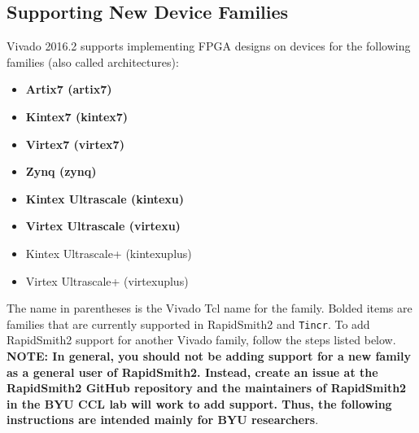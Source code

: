 \subsection{Supporting New Device Families} \label{sec:newFamilies}
Vivado 2016.2 supports implementing FPGA designs on devices for the following
families (also called architectures):

\begin{multicols}{2}
	\begin {itemize}
	  \item \textbf{Artix7 (artix7)}
	  \item \textbf{Kintex7 (kintex7)}
	  \item \textbf{Virtex7 (virtex7)}
	  \item \textbf{Zynq (zynq)}
	  \item \textbf{Kintex Ultrascale (kintexu)}
	  \item \textbf{Virtex Ultrascale (virtexu)}
	  \item Kintex Ultrascale+ (kintexuplus)
	  \item Virtex Ultrascale+ (virtexuplus)
	\end{itemize}
\end{multicols}

\noindent The name in parentheses is the Vivado Tcl name for the family. Bolded
items are families that are currently supported in RapidSmith2 and
\texttt{Tincr}. To add RapidSmith2 support for another Vivado family, follow the
steps listed below. \textbf{NOTE: In general, you should not be adding support
for a new family as a general user of RapidSmith2. Instead, create an issue at the
RapidSmith2 GitHub repository and the maintainers of RapidSmith2 in the BYU CCL
lab will work to add support. Thus, the following instructions are intended
mainly for BYU researchers}.

